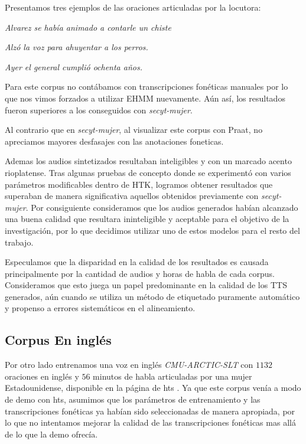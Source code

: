 Presentamos tres ejemplos de las oraciones articuladas por la locutora:

\indent\indent \textit{Alvarez se había animado a contarle un chiste}

\indent\indent \textit{Alzó la voz para ahuyentar a los perros.}

\indent\indent \textit{Ayer el general cumplió ochenta años.}

Para este corpus no contábamos con transcripciones fonéticas manuales por lo que nos vimos forzados a utilizar EHMM nuevamente. Aún así, los resultados fueron superiores a los conseguidos con \textit{secyt-mujer}. 

Al contrario que en \textit{secyt-mujer}, al visualizar este corpus con Praat, no apreciamos mayores desfasajes con las anotaciones foneticas.

Ademas los audios sintetizados resultaban inteligibles y con un marcado acento rioplatense. Tras algunas pruebas de concepto donde se experimentó con varios parámetros modificables dentro de HTK, logramos obtener resultados que superaban de manera significativa aquellos obtenidos previamente con \textit{secyt-mujer}. Por consiguiente consideramos que los audios generados habían alcanzado una buena calidad que resultara ininteligible y aceptable para el objetivo de la investigación, por lo que decidimos utilizar uno de estos modelos para el resto del trabajo.


Especulamos que la disparidad en la calidad de los resultados es causada principalmente por la cantidad de audios y horas de habla de cada corpus\cite{whyItSucked}. Consideramos que esto juega un papel predominante en la calidad de los TTS generados, aún cuando se utiliza un método de etiquetado puramente automático y propenso a errores sistemáticos en el alineamiento.


\subsection{Corpus En inglés}

Por otro lado entrenamos una voz en inglés \textit{CMU-ARCTIC-SLT}\cite{cmuArtic} con $1132$ oraciones en inglés y $56$ minutos de habla articuladas por una mujer Estadounidense, disponible en la página de hts \cite{hts}. Ya que este corpus venía a modo de demo con hts, asumimos que los parámetros de entrenamiento y las transcripciones fonéticas ya habían sido seleccionadas de manera apropiada, por lo que no intentamos mejorar la calidad de las transcripciones fonéticas mas allá de lo que la demo ofrecía.

